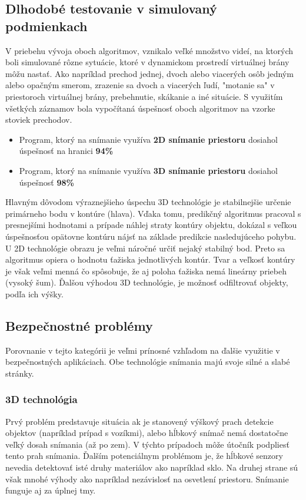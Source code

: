 \subsection{Dlhodobé testovanie v simulovaný podmienkach}
V priebehu vývoja oboch algoritmov, vznikalo veľké množstvo videí, na ktorých boli simulované rôzne sytuácie, ktoré v dynamickom prostredí virtuálnej brány môžu nastať. Ako napríklad prechod jednej, dvoch alebo viacerých osôb jedným alebo opačným smerom, zrazenie sa dvoch a viacerých ľudí, "motanie sa" v priestoroch virtuálnej brány, prebehnutie, skákanie a iné situácie. S využitím všetkých záznamov bola vypočítaná úspešnosť oboch algoritmov na vzorke stoviek prechodov.    



\begin{itemize}
\item Program, ktorý na snímanie využíva \textbf{2D snímanie priestoru} dosiahol úspešnosť na hranici \textbf{94\%}
\item Program, ktorý na snímanie využíva \textbf{3D snímanie priestoru} dosiahol úspešnosť \textbf{98\%}
\end{itemize}

Hlavným dôvodom výraznejšieho úspechu 3D technológie je stabilnejšie určenie primárneho bodu v kontúre (hlava). Vďaka tomu, predikčný algoritmus pracoval s presnejšími hodnotami a prípade náhlej straty kontúry objektu, dokázal s veľkou úspešnosťou opätovne kontúru nájsť na základe predikcie nasledujúceho pohybu. U 2D technológie obrazu je veľmi náročné určiť nejaký stabilný bod. Preto sa algoritmus opiera o hodnotu ťažiska jednotlivých kontúr. Tvar a veľkosť kontúry je však veľmi menná čo spôsobuje, že aj poloha ťažiska nemá lineárny priebeh (vysoký šum). Ďalšou výhodou 3D technológie, je možnosť odfiltrovať objekty, podľa ich výšky.

\vspace{5mm}


\subsection{Bezpečnostné problémy}
Porovnanie v tejto kategórii je veľmi prínosné vzhľadom na ďalšie využitie v bezpečnostných aplikáciach. Obe technológie snímania majú svoje silné a slabé stránky.
\subsubsection{3D technológia}
Prvý problém predstavuje situácia ak je stanovený výškový prach detekcie objektov (napríklad prípad s vozíkmi), alebo hĺbkový snímač nemá dostatočne veľký dosah snímania (až po zem). V týchto prípadoch môže útočník podpliesť tento prah snímania. Ďalším potenciálnym problémom je, že hĺbkové senzory nevedia detektovať isté druhy materiálov ako napríklad sklo. Na druhej strane sú však mnohé výhody ako napríklad  nezávislosť na osvetlení priestoru. Snímanie funguje aj za úplnej tmy. 

